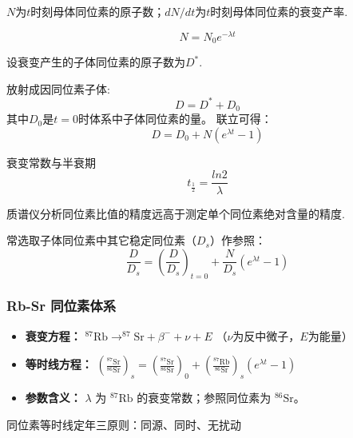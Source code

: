 \documentclass[12pt,a4paper]{article}
\begin{document}
	$N$为$t$时刻母体同位素的原子数；$dN/dt$为$t$时刻母体同位素的衰变产率.
	
	$$N=N_0e^{-\lambda t}$$
	
	设衰变产生的子体同位素的原子数为$D^*$.
	
	放射成因同位素子体: $$D=D^*+D_0$$
	其中$D_0$是$t=0$时体系中子体同位素的量。
	联立可得：$$D=D_0+N(e^{\lambda t}-1)$$
	
	衰变常数与半衰期
	$$t_{\frac{1}{2}}= \frac{ln2}{\lambda}$$
	
	质谱仪分析同位素比值的精度远高于测定单个同位素绝对含量的精度.
	
	常选取子体同位素中其它稳定同位素（$D_s$）作参照：
	$$\frac{D}{D_s}=\left(\frac{D}{D_s}\right)_{t=0}+\frac{N}{D_s}(e^{\lambda t}-1)$$
	
	\subsubsection{Rb-Sr 同位素体系}
	\begin{itemize}
		\item \textbf{衰变方程：} $^{87}\text{Rb} \rightarrow ^{87}\text{Sr} + \beta^- + \nu + E$ （$\nu$为反中微子，$E$为能量）
		\item \textbf{等时线方程：} 
		$\left( \frac{^{87}\text{Sr}}{^{86}\text{Sr}} \right)_s = \left( \frac{^{87}\text{Sr}}{^{86}\text{Sr}} \right)_0 + \left( \frac{^{87}\text{Rb}}{^{86}\text{Sr}} \right)_s (e^{\lambda t} - 1)$
		\item \textbf{参数含义：} $\lambda$ 为 $^{87}\text{Rb}$ 的衰变常数；参照同位素为 $^{86}\text{Sr}$。
	\end{itemize}
	
	同位素等时线定年三原则：同源、同时、无扰动
	
\end{document}
